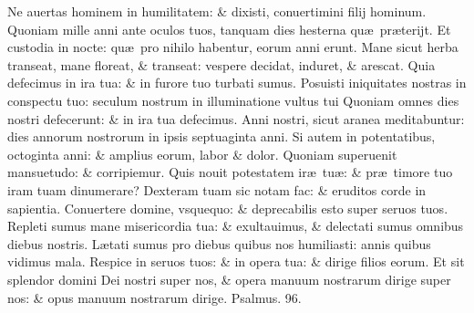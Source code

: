 \documentclass[a5paper,10pt]{book}
\def\ae{æ}
\begin{document}
\begin{multicols*}{2}
\newline \color{red} N\color{black}e auertas hominem in humilitatem: \& dixisti, conuertimini filij hominum.
\newline \color{red} Q\color{black}uoniam mille anni ante oculos tuos, tanquam dies hesterna qu\ae \ pr\ae terijt.
\newline \color{red} E\color{black}t custodia in nocte: qu\ae \ pro nihilo habentur, eorum anni erunt.
\newline \color{red} M\color{black}ane sicut herba transeat, mane floreat, \& transeat: vespere decidat, induret, \& arescat.
\newline \color{red} Q\color{black}uia defecimus in ira tua: \& in furore tuo turbati sumus.
\newline \color{red} P\color{black}osuisti iniquitates nostras in conspectu tuo: seculum nostrum in illuminatione vultus tui
\newline \color{red} Q\color{black}uoniam omnes dies nostri defecerunt: \& in ira tua defecimus.
\newline \color{red} A\color{black}nni nostri, sicut aranea meditabuntur: dies annorum nostrorum in ipsis septuaginta anni.
\newline \color{red} S\color{black}i autem in potentatibus, octoginta anni: \& amplius eorum, labor \& dolor.
\newline \color{red} Q\color{black}uoniam superuenit mansuetudo: \& corripiemur.
\newline \color{red} Q\color{black}uis nouit potestatem ir\ae \ tu\ae : \& pr\ae \ timore tuo iram tuam dinumerare?
\newline \color{red} D\color{black}exteram tuam sic notam fac: \& eruditos corde in sapientia.
\newline \color{red} C\color{black}onuertere domine, vsquequo: \& deprecabilis esto super seruos tuos.
\newline \color{red} R\color{black}epleti sumus mane misericordia tua: \& exultauimus, \& delectati sumus omnibus diebus nostris.
\newline \color{red} L\color{black}\ae tati sumus pro diebus quibus nos humiliasti: annis quibus vidimus mala.
\newline \color{red} R\color{black}espice in seruos tuos: \& in opera tua: \& dirige filios eorum.
\newline \color{red} E\color{black}t sit splendor domini Dei nostri super nos, \& opera manuum nostrarum dirige super nos: \& opus manuum nostrarum dirige. \quad \color{red} Psalmus. \hypertarget{ps96}{96.} \color{black}

\end{multicols*}
\end{document}
